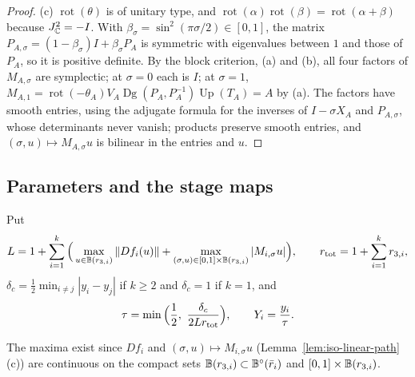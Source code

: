 \begin{proof}
(c) $\operatorname{rot}(\theta)$ is of unitary type, and $\operatorname{rot}(\alpha)\operatorname{rot}(\beta)=\operatorname{rot}(\alpha+\beta)$ because $J_{\mathbb{C}}^2=-I$. With $\beta_\sigma=\sin^2(\pi\sigma/2)\in[0,1]$, the matrix $P_{A,\sigma}=(1-\beta_\sigma)I+\beta_\sigma P_A$ is symmetric with eigenvalues between $1$ and those of $P_A$, so it is positive definite. By the block criterion, (a) and (b), all four factors of $M_{A,\sigma}$ are symplectic; at $\sigma=0$ each is $I$; at $\sigma=1$, $M_{A,1}=\operatorname{rot}(-\theta_A)V_A\operatorname{Dg}(P_A,P_A^{-1})\operatorname{Up}(T_A)=A$ by (a). The factors have smooth entries, using the adjugate formula for the inverses of $I-\sigma X_A$ and $P_{A,\sigma}$, whose determinants never vanish; products preserve smooth entries, and $(\sigma,u)\mapsto M_{A,\sigma}u$ is bilinear in the entries and $u$.
\end{proof}

\subsection{Parameters and the stage maps}\label{sec:iso-parameters}

\begin{definition}[Parameters]\label{def:iso-parameters}
Put
\[
 L=1+\sum_{i=1}^k\Big(\max_{u\in\mathbb{B}(r_{3,i})}\|Df_i(u)\|+\max_{(\sigma,u)\in[0,1]\times\mathbb{B}(r_{3,i})}|M_{i,\sigma}u|\Big),
 \qquad r_{\rm tot}=1+\sum_{i=1}^kr_{3,i} ,
\]
$\delta_c=\frac12\min_{i\ne j}|y_i-y_j|$ if $k\ge2$ and $\delta_c=1$ if $k=1$, and
\[
 \tau=\min\Big(\frac12,\ \frac{\delta_c}{2Lr_{\rm tot}}\Big),\qquad Y_i=\frac{y_i}{\tau}.
\]
\end{definition}

The maxima exist since $Df_i$ and $(\sigma,u)\mapsto M_{i,\sigma}u$ (Lemma~\ref{lem:iso-linear-path}(c)) are continuous on the compact sets $\mathbb{B}(r_{3,i})\subset\mathbb{B}^\circ(\bar r_i)$ and $[0,1]\times\mathbb{B}(r_{3,i})$.

